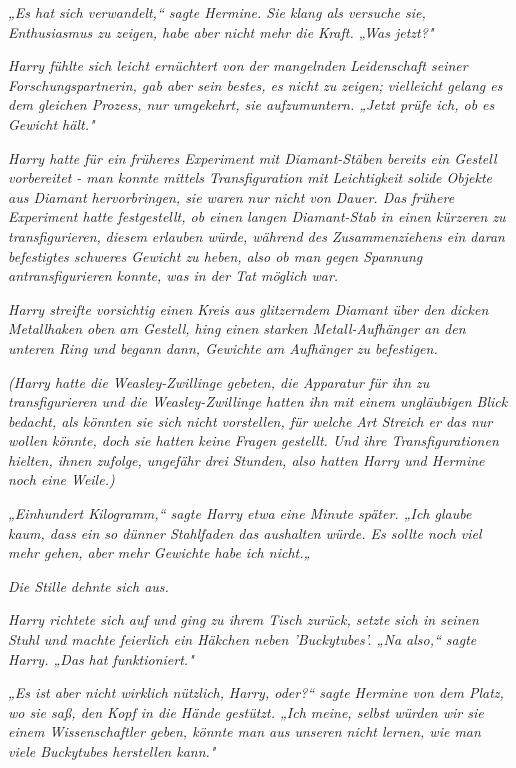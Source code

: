 {\emph{„Es hat sich verwandelt,“ sagte Hermine. Sie klang als versuche sie, Enthusiasmus zu zeigen, habe aber nicht mehr die Kraft. „Was jetzt?"}

\emph{Harry fühlte sich leicht ernüchtert von der mangelnden Leidenschaft seiner Forschungspartnerin, gab aber sein bestes, es nicht zu zeigen; vielleicht gelang es dem gleichen Prozess, nur umgekehrt, sie aufzumuntern. „Jetzt prüfe ich, ob es Gewicht hält."}

\emph{Harry hatte für ein früheres Experiment mit Diamant-Stäben bereits ein Gestell vorbereitet - man konnte mittels Transfiguration mit Leichtigkeit solide Objekte aus Diamant hervorbringen, sie waren nur nicht von Dauer. Das frühere Experiment hatte festgestellt, ob einen langen Diamant-Stab in einen kürzeren zu transfigurieren,} \emph{diesem} \emph{erlauben würde, während des Zusammenziehens ein daran befestigtes schweres Gewicht zu heben, also ob man gegen Spannung antransfigurieren konnte, was in der Tat möglich} \emph{war.}

\emph{Harry streifte vorsichtig einen Kreis aus glitzerndem Diamant über den dicken Metallhaken oben am Gestell, hing einen starken Metall-Aufhänger an den} \emph{unteren Ring und begann dann, Gewichte am Aufhänger zu befestigen.}

\emph{(Harry hatte die Weasley-Zwillinge gebeten, die Apparatur für ihn zu transfigurieren und die Weasley-Zwillinge hatten ihn mit einem ungläubigen Blick bedacht, als könnten sie sich nicht vorstellen, für} \emph{\emph{welche}} \emph{Art Streich er das nur wollen könnte, doch sie hatten keine Fragen gestellt. Und ihre Transfigurationen hielten, ihnen zufolge, ungefähr drei Stunden, also hatten Harry und Hermine noch eine Weile.)}

\emph{„Einhundert Kilogramm,“ sagte Harry etwa eine Minute später. „Ich glaube kaum, dass ein so dünner Stahlfaden das aushalten würde. Es sollte noch viel mehr gehen, aber mehr Gewichte habe ich nicht.„}

\emph{Die Stille dehnte sich aus.}

\emph{Harry richtete sich auf und ging zu ihrem Tisch zurück, setzte sich in seinen Stuhl und machte feierlich ein Häkchen neben 'Buckytubes'. „Na also,“ sagte Harry. „\emph{Das}} \emph{hat funktioniert."}

\emph{„Es ist aber nicht wirklich} \emph{\emph{nützlich,}} \emph{Harry, oder?“ sagte Hermine von dem Platz, wo sie saß, den Kopf in die Hände gestützt. „Ich meine, selbst würden wir sie einem Wissenschaftler geben, könnte man aus unseren nicht lernen, wie man viele Buckytubes herstellen kann."}

}
